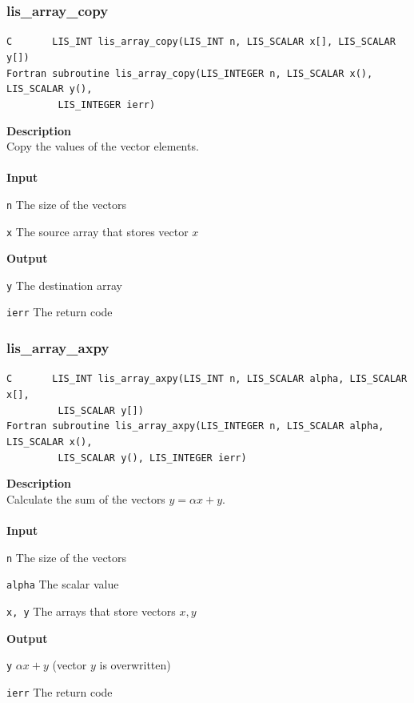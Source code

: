 \documentclass[a4paper]{article}
\newcommand{\namelistlabel}[1]{\mbox{#1}\hfill}
\newenvironment{namelist}[1]{%
\begin{list}{}
  {\let\makelabel\namelistlabel
  \settowidth{\labelwidth}{#1}
  \setlength{\leftmargin}{1.1\labelwidth}}
  }{%
\end{list}}
\begin{document}
\subsubsection{lis\_array\_copy}
\begin{screen}
\verb|C       LIS_INT lis_array_copy(LIS_INT n, LIS_SCALAR x[], LIS_SCALAR y[])|\\
\verb|Fortran subroutine lis_array_copy(LIS_INTEGER n, LIS_SCALAR x(), LIS_SCALAR y(),|\\
\verb|         LIS_INTEGER ierr)|
\end{screen}
{\bf Description}\\
\indent
Copy the values of the vector elements.
\\ \\
\noindent
{\bf Input}
\begin{namelist}{XXXXXXXXXXXXXXXXXXXX}
\item[\tt n] The size of the vectors  
\item[\tt x] The source array that stores vector $x$
\end{namelist}
{\bf Output}
\begin{namelist}{XXXXXXXXXXXXXXXXXXXX}
\item[\tt y] The destination array
\item[\tt ierr] The return code
\end{namelist}

\newpage
\subsubsection{lis\_array\_axpy}
\begin{screen}
  \verb|C       LIS_INT lis_array_axpy(LIS_INT n, LIS_SCALAR alpha, LIS_SCALAR x[],|\\
\verb|         LIS_SCALAR y[])|\\
\verb|Fortran subroutine lis_array_axpy(LIS_INTEGER n, LIS_SCALAR alpha, LIS_SCALAR x(),|\\
\verb|         LIS_SCALAR y(), LIS_INTEGER ierr)|
\end{screen}
{\bf Description}\\
\indent
Calculate the sum of the vectors $y = \alpha x + y$.
\\ \\
\noindent
{\bf Input}
\begin{namelist}{XXXXXXXXXXXXXXXXXXXX}
\item[\tt n] The size of the vectors  
\item[\tt alpha] The scalar value
\item[\tt x, y] The arrays that store vectors $x, y$
\end{namelist}
{\bf Output}
\begin{namelist}{XXXXXXXXXXXXXXXXXXXX}
\item[\tt y] $\alpha x + y$ (vector $y$ is overwritten)
\item[\tt ierr] The return code
\end{namelist}
\end{document}
